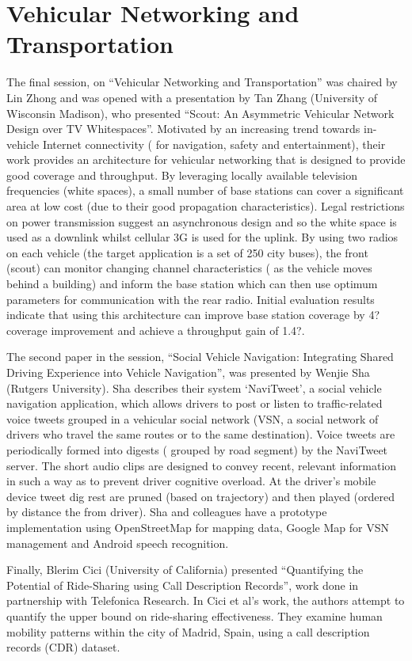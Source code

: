\section{Vehicular Networking and Transportation}
\label{sec:vehiclenets}

The final session, on ``Vehicular Networking and Transportation'' was chaired by 
Lin Zhong and was opened with a presentation by Tan Zhang (University of 
Wisconsin Madison), who presented ``Scout: An Asymmetric Vehicular Network Design 
over TV Whitespaces''. Motivated by an increasing trend towards in-vehicle 
Internet connectivity (\eg{} for navigation, safety and entertainment), their 
work provides an architecture for vehicular networking that is designed to 
provide good coverage and throughput. By leveraging locally available television 
frequencies (white spaces), a small number of base stations can cover a 
significant area at low cost (due to their good propagation characteristics).
Legal restrictions on power transmission suggest an asynchronous design and so 
the white space is used as a downlink whilst cellular 3G is used for the uplink.
By using two radios on each vehicle (the target application is a set of 250 city 
buses), the front (scout) can monitor changing channel characteristics (\eg{} as 
the vehicle moves behind a building) and inform the base station which can then 
use optimum parameters for communication with the rear radio. Initial evaluation 
results indicate that using this architecture can improve base station coverage 
by 4? coverage improvement and achieve a throughput gain of 1.4?.

The second paper in the session, ``Social Vehicle Navigation: Integrating Shared 
Driving Experience into Vehicle Navigation'', was presented by Wenjie Sha 
(Rutgers University). Sha describes their system `NaviTweet', a social vehicle
navigation application, which allows drivers to post or listen to traffic-related 
voice tweets grouped in a vehicular social network (VSN, a social network of 
drivers who travel the same routes or to the same destination). Voice tweets are 
periodically formed into digests (\eg{} grouped by road segment) by the NaviTweet 
server. The short audio clips are designed to convey recent, relevant information 
in such a way as to prevent driver cognitive overload. At the driver's mobile 
device tweet dig rest are pruned (based on trajectory) and then played (ordered 
by distance the from driver). Sha and colleagues have a prototype implementation
using OpenStreetMap for mapping data, Google Map for VSN management and Android 
speech recognition.

Finally, Blerim Cici (University of California) presented ``Quantifying the 
Potential of Ride-Sharing using Call Description Records'', work done in 
partnership with Telefonica Research. In Cici et al's work, the authors attempt 
to quantify the upper bound on ride-sharing effectiveness. They examine human 
mobility patterns within the city of Madrid, Spain, using a call description 
records (CDR) dataset.